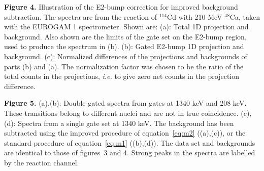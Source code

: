 {\bf Figure 4.} 
Illustration of the E2-bump correction for improved background subtraction.
The spectra are from the reaction of $^{114}$Cd with 210 MeV $^{48}$Ca, taken
with the EUROGAM 1 spectrometer. Shown are:
(a): Total 1D projection and background. Also shown are the limits of the gate
     set on the E2-bump region, used to produce the spectrum in (b).
(b): Gated E2-bump 1D projection and background.
(c): Normalized differences of the projections and backgrounds of parts (b) and
     (a). The normalization factor was chosen to be the ratio of the total
     counts in the projections, {\em i.e.} to give zero net counts in the
     projection difference.
\vspace{5mm}

{\bf Figure 5.} 
(a),(b): Double-gated spectra from gates at 1340 keV and 208 keV.
These transitions belong to different nuclei and are not in true coincidence.
(c),(d): Spectra from a single gate set at 1340 keV.
The background has been subtracted using the improved procedure of
equation~\ref{eq:m2} ((a),(c)), or the standard procedure of
equation~\ref{eq:m1} ((b),(d)). The data set and backgrounds are identical to
those of figures~3 and 4. Strong peaks in the spectra are labelled by the
reaction channel.


